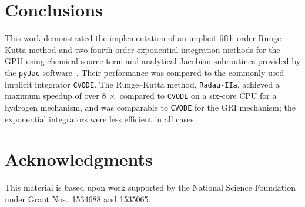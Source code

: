 \documentclass[preprint]{elsarticle}
\begin{document}
\section{Conclusions}
This work demonstrated the implementation of an implicit fifth-order Runge--Kutta method and two fourth-order exponential integration methods for the GPU using chemical source term and analytical Jacobian subroutines provided by the \texttt{pyJac} software~\cite{Niemeyer:2015i}.
Their performance was compared to the commonly used implicit integrator \texttt{CVODE}.
The Runge--Kutta method, \texttt{Radau-IIa}, achieved a maximum speedup of over $\SI{8}{\times}$ compared to \texttt{CVODE} on a six-core CPU for a hydrogen mechanism, and was comparable to \texttt{CVODE} for the GRI mechanism; the exponential integrators were less efficient in all cases.


\section*{Acknowledgments}

This material is based upon work supported by the National Science Foundation under Grant Nos.~1534688 and 1535065.


\pagebreak



\end{document}
